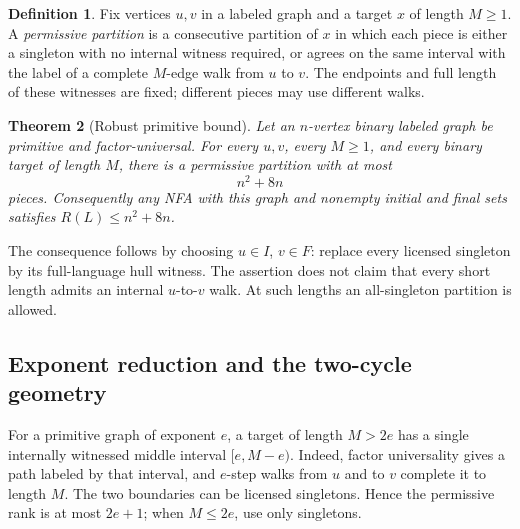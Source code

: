 \documentclass[11pt,letterpaper]{article}
\newtheorem{theorem}{Theorem}[section]
\theoremstyle{definition}
\newtheorem{definition}[theorem]{Definition}
\theoremstyle{remark}
\begin{document}
\begin{definition}
Fix vertices $u,v$ in a labeled graph and a target $x$ of length $M\ge1$. A \emph{permissive partition} is a consecutive partition of $x$ in which each piece is either a singleton with no internal witness required, or agrees on the same interval with the label of a complete $M$-edge walk from $u$ to $v$. The endpoints and full length of these witnesses are fixed; different pieces may use different walks.
\end{definition}

\begin{samepage}
\begin{theorem}[Robust primitive bound]\label{ccc:sc:thm:primitive}
Let an $n$-vertex binary labeled graph be primitive and factor-universal. For every $u,v$, every $M\ge1$, and every binary target of length $M$, there is a permissive partition with at most
\[
 n^2+8n
\]
pieces. Consequently any NFA with this graph and nonempty initial and final sets satisfies $R(L)\le n^2+8n$.
\end{theorem}
\end{samepage}

The consequence follows by choosing $u\in I$, $v\in F$: replace every licensed singleton by its full-language hull witness. The assertion does not claim that every short length admits an internal $u$-to-$v$ walk. At such lengths an all-singleton partition is allowed.

\subsection{Exponent reduction and the two-cycle geometry}

For a primitive graph of exponent $e$, a target of length $M>2e$ has a single internally witnessed middle interval $[e,M-e)$. Indeed, factor universality gives a path labeled by that interval, and $e$-step walks from $u$ and to $v$ complete it to length $M$. The two boundaries can be licensed singletons. Hence the permissive rank is at most $2e+1$; when $M\le2e$, use only singletons.
\end{document}
